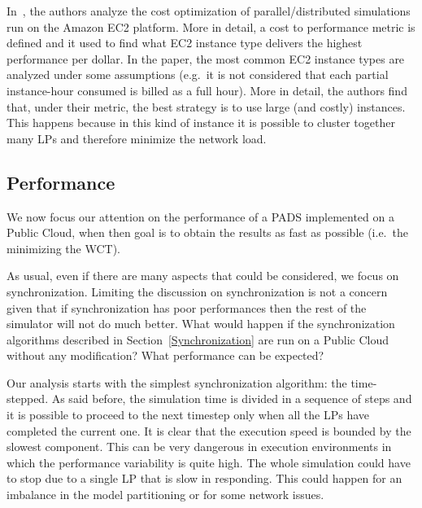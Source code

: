 \documentclass[1p]{elsarticle}
\begin{document}
In~\cite{Vanmechelen2013126}, the authors analyze the cost optimization
of parallel/distributed simulations run on the Amazon EC2 platform.
More in detail, a cost to performance metric is defined and it used to 
find what EC2 instance type delivers the highest performance per dollar.
In the paper, the most common EC2 instance types are analyzed
under some assumptions (e.g.~it is not considered that each partial 
instance-hour consumed is billed as a full hour). More in detail,
the authors find that, under their metric, the best strategy is to use
large (and costly) instances. This happens because in this kind of instance
it is possible to cluster together many LPs and therefore minimize the 
network load.


\subsection{Performance}\label{sec:performance}

We now focus our attention on the performance of a PADS implemented on
a Public Cloud, when then goal is to obtain the results as fast as
possible (i.e.~the minimizing the WCT).

As usual, even if there are many aspects that could be considered, we
focus on synchronization. Limiting the discussion on synchronization 
is not a concern given that if synchronization has poor performances 
then the rest of the simulator will not do much better. What would 
happen if the synchronization algorithms described in 
Section~\ref{Synchronization} are run on a Public Cloud without 
any modification? What performance can be expected?

Our analysis starts with the simplest synchronization algorithm: 
the time-stepped. As said before, the simulation time is divided in 
a sequence of steps and it is possible to proceed to the next timestep 
only when all the LPs have completed the current one. It is clear that 
the execution speed is bounded by the slowest component. This can be very 
dangerous in execution environments in which the performance variability 
is quite high. The whole simulation could have to stop due to a single LP 
that is slow in responding. This could happen for an imbalance in the model 
partitioning or for some network issues. 
\end{document}
